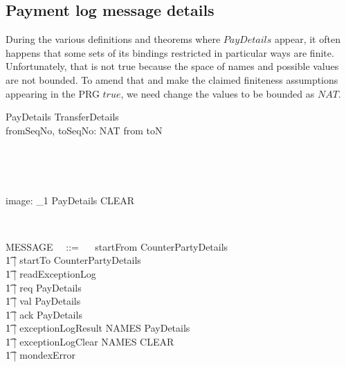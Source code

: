 \subsection{Payment log message details}

During the various definitions and theorems where $PayDetails$
appear, it often happens that some sets of its bindings restricted
in particular ways are finite. Unfortunately, that is not true
because the space of names and possible values are not bounded.
To amend that and make the claimed finiteness assumptions appearing
in the PRG $true$, we need change the values to be bounded as $NAT$.
%
\begin{LSDef}
\begin{schema}{PayDetails}
    TransferDetails \\
    fromSeqNo, toSeqNo: NAT
\where
    from \neq toN
\end{schema}~\end{LSDef}

\begin{LGSet}
\begin{zed}
   [CLEAR]
\end{zed}~\end{LGSet}

\begin{LADef}
\begin{axdef}
   image: \power_1 PayDetails \inj CLEAR
\end{axdef}~\end{LADef}

\begin{LFType}
\begin{zed}
   MESSAGE ~~::= ~~ startFrom \ldata CounterPartyDetails \rdata \\
           \t1 | startTo \ldata CounterPartyDetails \rdata \\
           \t1 | readExceptionLog \\
           \t1 | req \ldata PayDetails \rdata \\
           \t1 | val \ldata PayDetails \rdata \\
           \t1 | ack \ldata PayDetails \rdata \\
           \t1 | exceptionLogResult \ldata NAMES \cross PayDetails \rdata \\
           \t1 | exceptionLogClear \ldata NAMES \cross CLEAR \rdata \\
           \t1 | mondexError
\end{zed}~\end{LFType}

